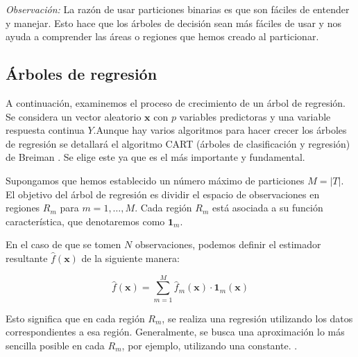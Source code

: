 \noindent \emph{Observación:} La razón de usar particiones binarias es que son fáciles de entender y manejar. Esto hace que los árboles de decisión sean más fáciles de usar y nos ayuda a comprender las áreas o regiones que hemos creado al particionar. 


 

\subsection{Árboles de regresión }
\noindent A continuación, examinemos el  proceso de crecimiento de un árbol de regresión. Se considera un vector aleatorio $\mathbf{x}$ con $p$ variables predictoras y una variable respuesta continua $Y$.Aunque hay varios algoritmos para hacer crecer los árboles de regresión se detallará el algoritmo CART (árboles de clasificación y regresión) de Breiman \cite{Breiman 1984}. Se elige este ya que es el más importante y fundamental. 

\noindent Supongamos que hemos establecido un número máximo de particiones $M=|T|$. El objetivo del árbol de regresión es dividir el espacio de observaciones en regiones $R_m$ para $m=1,\ldots, M$. Cada región $R_m$ está asociada a su función característica, que denotaremos como $\mathbf{1}_m$.

\noindent En el caso de que se tomen $N$ observaciones, podemos definir el estimador resultante $\hat{f}(\mathbf{x})$ de la siguiente manera:

\begin{equation}
\hat{f}(\mathbf{x})=\sum_{m=1}^M \hat{f}_m(\mathbf{x})\cdot \mathbf{1}_m(\mathbf{x})
\end{equation}

\noindent Esto significa que en cada región $R_m$, se realiza una regresión utilizando los datos correspondientes a esa región. Generalmente, se busca una aproximación lo más sencilla posible en cada $R_m$, por ejemplo, utilizando una constante. \cite{Hastie 2001,Biau 2016}.

